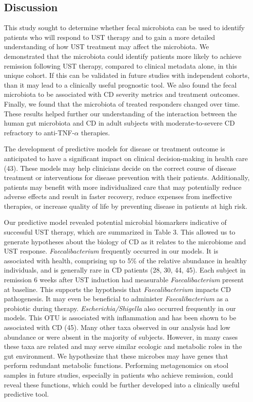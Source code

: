 \documentclass[12pt,]{article}
\begin{document}
\subsection{Discussion}\label{discussion}

This study sought to determine whether fecal microbiota can be used to
identify patients who will respond to UST therapy and to gain a more
detailed understanding of how UST treatment may affect the microbiota.
We demonstrated that the microbiota could identify patients more likely
to achieve remission following UST therapy, compared to clinical
metadata alone, in this unique cohort. If this can be validated in
future studies with independent cohorts, than it may lead to a
clinically useful prognostic tool. We also found the fecal microbiota to
be associated with CD severity metrics and treatment outcomes. Finally,
we found that the microbiota of treated responders changed over time.
These results helped further our understanding of the interaction
between the human gut microbiota and CD in adult subjects with
moderate-to-severe CD refractory to anti-TNF-\({\alpha}\) therapies.

The development of predictive models for disease or treatment outcome is
anticipated to have a significant impact on clinical decision-making in
health care (43). These models may help clinicians decide on the correct
course of disease treatment or interventions for disease prevention with
their patients. Additionally, patients may benefit with more
individualized care that may potentially reduce adverse effects and
result in faster recovery, reduce expenses from ineffective therapies,
or increase quality of life by preventing disease in patients at high
risk.

Our predictive model revealed potential microbial biomarkers indicative
of successful UST therapy, which are summarized in Table 3. This allowed
us to generate hypotheses about the biology of CD as it relates to the
microbiome and UST response. \emph{Faecalibacterium} frequently occurred
in our models. It is associated with health, comprising up to 5\% of the
relative abundance in healthy individuals, and is generally rare in CD
patients (28, 30, 44, 45). Each subject in remission 6 weeks after UST
induction had measurable \emph{Faecalibacterium} present at baseline.
This supports the hypothesis that \emph{Faecalibacterium} impacts CD
pathogenesis. It may even be beneficial to administer
\emph{Faecalibacterium} as a probiotic during therapy.
\emph{Escherichia/Shigella} also occurred frequently in our models. This
OTU is associated with inflammation and has been shown to be associated
with CD (45). Many other taxa observed in our analysis had low abundance
or were absent in the majority of subjects. However, in many cases these
taxa are related and may serve similar ecologic and metabolic roles in
the gut environment. We hypothesize that these microbes may have genes
that perform redundant metabolic functions. Performing metagenomics on
stool samples in future studies, especially in patients who achieve
remission, could reveal these functions, which could be further
developed into a clinically useful predictive tool.
\end{document}
